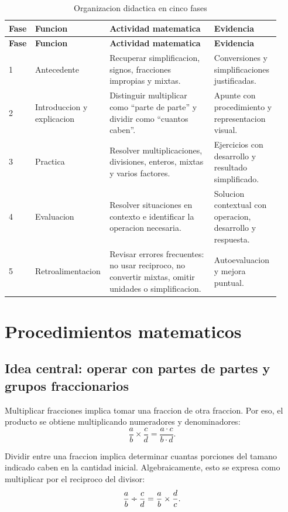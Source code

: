 \documentclass[
	spanish,
	letterpaper, oneside
]{article}
\newcommand{\signodiv}{\mathbin{\text{\normalfont\textdiv}}}
\begin{document}
\begin{longtable}{@{}p{0.08\linewidth}p{0.22\linewidth}p{0.38\linewidth}p{0.24\linewidth}@{}}
	\caption{Organizacion didactica en cinco fases}\label{tab:secuencia-s03}\\
	\toprule
	\textbf{Fase} & \textbf{Funcion} & \textbf{Actividad matematica} & \textbf{Evidencia} \\
	\midrule
	\endfirsthead
	\toprule
	\textbf{Fase} & \textbf{Funcion} & \textbf{Actividad matematica} & \textbf{Evidencia} \\
	\midrule
	\endhead
	1 & Antecedente & Recuperar simplificacion, signos, fracciones impropias y mixtas. & Conversiones y simplificaciones justificadas. \\
	2 & Introduccion y explicacion & Distinguir multiplicar como ``parte de parte'' y dividir como ``cuantos caben''. & Apunte con procedimiento y representacion visual. \\
	3 & Practica & Resolver multiplicaciones, divisiones, enteros, mixtas y varios factores. & Ejercicios con desarrollo y resultado simplificado. \\
	4 & Evaluacion & Resolver situaciones en contexto e identificar la operacion necesaria. & Solucion contextual con operacion, desarrollo y respuesta. \\
	5 & Retroalimentacion & Revisar errores frecuentes: no usar reciproco, no convertir mixtas, omitir unidades o simplificacion. & Autoevaluacion y mejora puntual. \\
	\bottomrule
\end{longtable}

\section{Procedimientos matematicos}

\subsection{Idea central: operar con partes de partes y grupos fraccionarios}

Multiplicar fracciones implica tomar una fraccion de otra fraccion. Por eso, el producto se obtiene multiplicando numeradores y denominadores:
\[
	\frac{a}{b}\times\frac{c}{d}=\frac{a\cdot c}{b\cdot d}.
\]

Dividir entre una fraccion implica determinar cuantas porciones del tamano indicado caben en la cantidad inicial. Algebraicamente, esto se expresa como multiplicar por el reciproco del divisor:
\[
	\frac{a}{b}\signodiv\frac{c}{d}=\frac{a}{b}\times\frac{d}{c}.
\]
\end{document}
